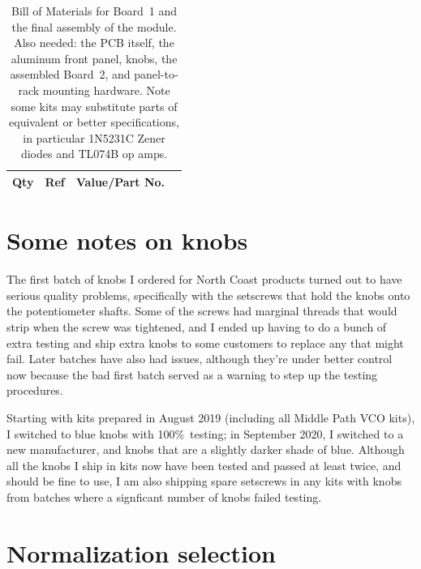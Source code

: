 \begin{table}
{\centering
{}
\vspace{\baselineskip}

\begin{tabular}{rp{1.4in}cp{2.9in}}
  \textbf{Qty} & \textbf{Ref} & \textbf{Value/Part No.} & \\ \hline

\end{tabular}\par}
\caption{Bill of Materials for Board~1 and the final assembly of
the module.  Also needed:
the PCB itself, the aluminum front panel, knobs, the assembled Board~2, and
panel-to-rack mounting hardware.  Note some kits may substitute parts of
equivalent or better specifications, in particular 1N5231C Zener diodes and
TL074B op amps.}\label{tab:b1bom}

\end{table}

\section{Some notes on knobs}

The first batch of knobs I ordered for North Coast products turned out to
have serious quality problems, specifically with the setscrews that hold the
knobs onto the potentiometer shafts.  Some of the screws had marginal
threads that would strip when the screw was tightened, and I ended up having
to do a bunch of extra testing and ship extra knobs to some customers to
replace any that might fail.  Later batches have also had issues, although
they're under better control now because the bad first batch served as a
warning to step up the testing procedures.

Starting with kits prepared in August 2019 (including all Middle Path VCO
kits), I switched to blue knobs with 100\%\ testing; in September 2020, I
switched to a new manufacturer, and knobs that are a slightly darker shade
of blue.  Although all the knobs I ship in kits now have been tested and
passed at least twice, and should be fine to use, I am also shipping spare
setscrews in any kits with knobs from batches where a signficant number of
knobs failed testing.

\section{Normalization selection}

